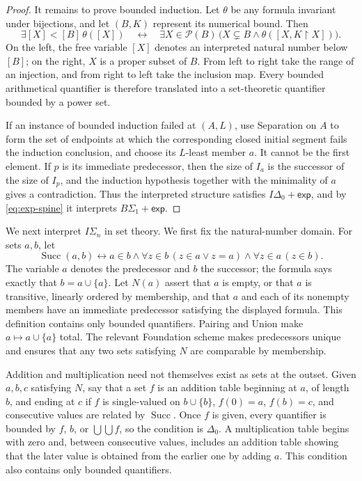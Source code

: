 \documentclass[11pt,a4paper]{article}
\newcommand{\IS}[1]{I\Sigma_{#1}}
\newcommand{\BS}[1]{B\Sigma_{#1}}
\newcommand{\expax}{\mathsf{exp}}
\theoremstyle{plain}
\theoremstyle{definition}
\theoremstyle{remark}
\begin{document}
\begin{proof}
  It remains to prove bounded induction. Let \(\theta\) be any formula invariant under bijections, and let \((B,K)\) represent its numerical bound. Then
  \[
  \exists [X]<[B]\,\theta([X])
  \quad\longleftrightarrow\quad
  \exists X\in\mathcal P(B)\,
  \bigl(X\subsetneq B\wedge\theta([X,K\!\upharpoonright X])\bigr).
  \]
  On the left, the free variable \([X]\) denotes an interpreted natural number below \([B]\); on the right, \(X\) is a proper subset of \(B\). From left to right take the range of an injection, and from right to left take the inclusion map. Every bounded arithmetical quantifier is therefore translated into a set-theoretic quantifier bounded by a power set.

  If an instance of bounded induction failed at \((A,L)\), use Separation on \(A\) to form the set of endpoints at which the corresponding closed initial segment fails the induction conclusion, and choose its \(L\)-least member \(a\). It cannot be the first element. If \(p\) is its immediate predecessor, then the size of \(I_a\) is the successor of the size of \(I_p\), and the induction hypothesis together with the minimality of \(a\) gives a contradiction. Thus the interpreted structure satisfies \(I\Delta_0+\expax\), and by \eqref{eq:exp-spine} it interprets \(\BS1+\expax\).
\end{proof}

We next interpret \(\IS{n}\) in set theory. We first fix the natural-number domain. For sets \(a,b\), let
\[
\operatorname{Succ}(a,b)\longleftrightarrow
a\in b\wedge\forall z\in b\,(z\in a\vee z=a)
\wedge\forall z\in a\,(z\in b).
\]
The variable \(a\) denotes the predecessor and \(b\) the successor; the formula says exactly that \(b=a\cup\{a\}\). Let \(N(a)\) assert that \(a\) is empty, or that \(a\) is transitive, linearly ordered by membership, and that \(a\) and each of its nonempty members have an immediate predecessor satisfying the displayed formula. This definition contains only bounded quantifiers. Pairing and Union make \(a\mapsto a\cup\{a\}\) total. The relevant Foundation scheme makes predecessors unique and ensures that any two sets satisfying \(N\) are comparable by membership.

Addition and multiplication need not themselves exist as sets at the outset. Given \(a,b,c\) satisfying \(N\), say that a set \(f\) is an addition table beginning at \(a\), of length \(b\), and ending at \(c\) if \(f\) is single-valued on \(b\cup\{b\}\), \(f(0)=a\), \(f(b)=c\), and consecutive values are related by \(\operatorname{Succ}\). Once \(f\) is given, every quantifier is bounded by \(f\), \(b\), or \(\bigcup\bigcup f\), so the condition is \(\Delta_0\). A multiplication table begins with zero and, between consecutive values, includes an addition table showing that the later value is obtained from the earlier one by adding \(a\). This condition also contains only bounded quantifiers.
\end{document}
